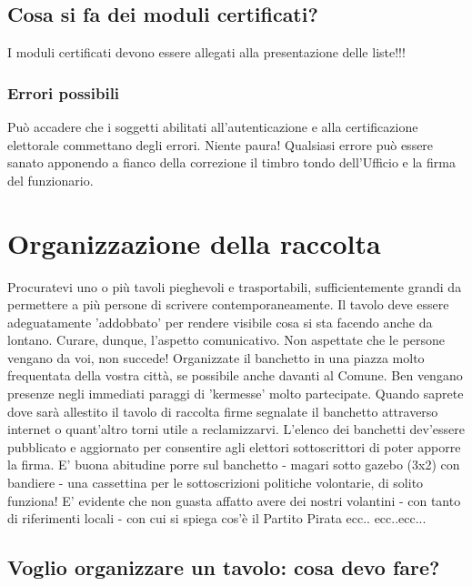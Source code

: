 \documentclass[paper=a4,11pt]{scrartcl}
\begin{document}
\subsection{Cosa si fa dei moduli certificati?}
I moduli certificati devono essere allegati alla presentazione delle liste!!!

\subsubsection{Errori possibili}
Può accadere che i soggetti abilitati all'autenticazione e alla certificazione 
elettorale commettano degli errori. Niente paura! Qualsiasi errore può essere 
sanato apponendo a fianco della correzione il timbro tondo dell'Ufficio e la 
firma del funzionario.

\section{Organizzazione della raccolta}
Procuratevi uno o più tavoli pieghevoli e trasportabili, sufficientemente 
grandi da permettere a più persone di scrivere contemporaneamente. Il tavolo 
deve essere adeguatamente 'addobbato' per rendere visibile cosa si sta facendo 
anche da lontano. Curare, dunque, l'aspetto comunicativo.
Non aspettate che le persone vengano da voi, non succede! Organizzate il 
banchetto in una piazza molto frequentata della vostra città, se possibile 
anche davanti al Comune. Ben vengano presenze negli immediati paraggi di 
'kermesse' molto partecipate. Quando saprete dove sarà allestito il tavolo di 
raccolta firme segnalate il banchetto attraverso internet o quant'altro torni 
utile a reclamizzarvi. L’elenco dei banchetti dev'essere pubblicato e 
aggiornato per consentire agli elettori sottoscrittori di poter apporre la 
firma. E' buona abitudine porre sul banchetto - magari sotto gazebo (3x2) con 
bandiere - una cassettina per le sottoscrizioni politiche volontarie, di solito 
funziona! E' evidente che non guasta affatto avere dei nostri volantini - con 
tanto di riferimenti locali - con cui si spiega cos'è il Partito Pirata ecc..
ecc..ecc...

\subsection{Voglio organizzare un tavolo: cosa devo fare?}
\end{document}

